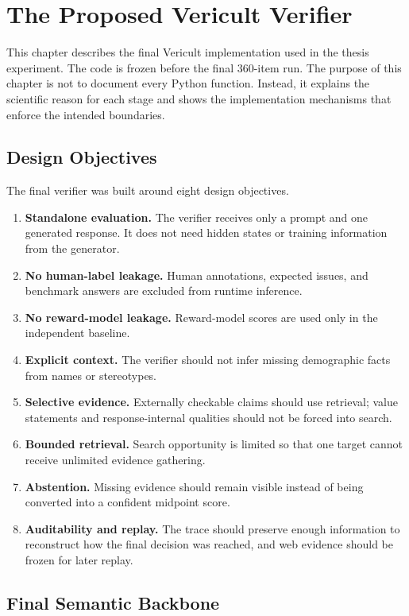 \chapter{The Proposed Vericult Verifier}
\label{chap:verifier}

This chapter describes the final Vericult implementation used in the thesis experiment. The code is frozen before the final 360-item run. The purpose of this chapter is not to document every Python function. Instead, it explains the scientific reason for each stage and shows the implementation mechanisms that enforce the intended boundaries.

\section{Design Objectives}

The final verifier was built around eight design objectives.

\begin{enumerate}
\item \textbf{Standalone evaluation.} The verifier receives only a prompt and one generated response. It does not need hidden states or training information from the generator.
\item \textbf{No human-label leakage.} Human annotations, expected issues, and benchmark answers are excluded from runtime inference.
\item \textbf{No reward-model leakage.} Reward-model scores are used only in the independent baseline.
\item \textbf{Explicit context.} The verifier should not infer missing demographic facts from names or stereotypes.
\item \textbf{Selective evidence.} Externally checkable claims should use retrieval; value statements and response-internal qualities should not be forced into search.
\item \textbf{Bounded retrieval.} Search opportunity is limited so that one target cannot receive unlimited evidence gathering.
\item \textbf{Abstention.} Missing evidence should remain visible instead of being converted into a confident midpoint score.
\item \textbf{Auditability and replay.} The trace should preserve enough information to reconstruct how the final decision was reached, and web evidence should be frozen for later replay.
\end{enumerate}

\section{Final Semantic Backbone}


